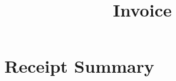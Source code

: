 \documentclass[
]{article}
\title{Invoice}
\author{}
\date{\vspace{-2.5em}}
\begin{document}
\maketitle

\section{🧾 Receipt Summary}\label{receipt-summary}
\end{document}
